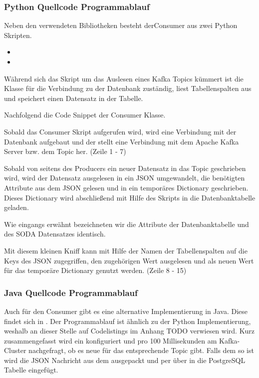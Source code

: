 \subsubsection{Python Quellcode Programmablauf}
Neben den verwendeten Bibliotheken besteht derConsumer aus zwei Python Skripten.

\begin{itemize}
  \item {}
  \item {}
\end{itemize}

Während sich das  Skript um das Auslesen eines Kafka Topics kümmert ist die  Klasse
für die Verbindung zu der Datenbank zuständig, liest Tabellenspalten aus und speichert einen Datensatz in der Tabelle.

Nachfolgend die Code Snippet der Consumer Klasse.



Sobald das Consumer Skript aufgerufen wird, wird eine Verbindung mit der Datenbank
aufgebaut und der  stellt eine Verbindung mit dem Apache Kafka
Server bzw. dem Topic  her.
(Zeile 1 - 7)

Sobald von seitens des Producers ein neuer Datensatz in das Topic  geschrieben wird,
wird der Datensatz ausgelesen in ein \ac{JSON} umgewandelt, die benötigten Attribute aus dem \ac{JSON} gelesen
und in ein temporäres Dictionary geschrieben.\\
Dieses Dictionary wird abschließend mit Hilfe des  Skripts in die
Datenbanktabelle geladen.

Wie eingangs erwähnt bezeichneten wir die Attribute der Datenbanktabelle und des \ac{SODA} Datensatzes identisch.

Mit diesem kleinen \glqq Kniff\grqq{} kann mit Hilfe der Namen der Tabellenspalten
auf die Keys des \ac{JSON} zugegriffen, den zugehörigen Wert ausgelesen und als neuen Wert für das temporäre Dictionary genutzt werden.
(Zeile 8 - 15)

\subsubsection{Java Quellcode Programmablauf}
Auch für den Consumer gibt es eine alternative Implementierung in Java.
Diese findet sich in .
Der Programmablauf ist ähnlich zu der Python Implementierung, weshalb an dieser Stelle auf Codelistings im Anhang TODO verwiesen wird.
Kurz zusammengefasst wird ein  konfiguriert und pro 100 Millisekunden am Kafka-Cluster nachgefragt, ob es neue  für das entsprechende Topic gibt.
Falls dem so ist wird die \ac{JSON} Nachricht aus dem  ausgepackt und per  über  in die PostgreSQL Tabelle eingefügt.
